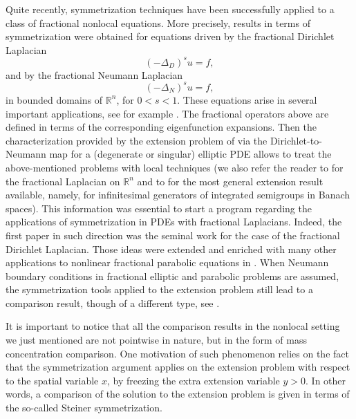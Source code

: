 \documentclass[a4paper,10pt,reqno]{amsart}
\newcommand{\R}{\mathbb{R}}
\numberwithin{equation}{section}
\begin{document}
Quite recently, symmetrization techniques have been successfully applied to a class of
fractional nonlocal equations. More precisely, results in terms of symmetrization were obtained
for equations driven by the fractional
Dirichlet Laplacian $$(-\Delta_D)^su=f,$$ and by the fractional Neumann
Laplacian $$(-\Delta_N)^su=f,$$ in bounded domains of $\R^n$, for $0<s<1$. These equations arise in
several important applications, see for example
\cite{Allen, Caffarelli-Stinga, Song-Vondracek, StingaVolz}. The fractional operators above are defined in terms of
the corresponding eigenfunction expansions. Then the characterization provided
by the extension problem of \cite{Stinga-Torrea}
via the Dirichlet-to-Neumann map for a (degenerate or singular) elliptic PDE
allows to treat the above-mentioned problems with local techniques
(we also refer the reader to \cite{Caffarelli-Silvestre}
for the fractional Laplacian on $\R^n$ and to \cite{Gale-Miana-Stinga} for the most general extension result
available, namely, for infinitesimal generators of integrated semigroups in Banach spaces).
This information was essential to start a program regarding the applications
of symmetrization in PDEs with fractional Laplacians. Indeed,
the first paper in such direction was the seminal work \cite{VolzDib} for the case of the fractional Dirichlet Laplacian.
Those ideas were extended and enriched with many other applications to nonlinear fractional parabolic
equations in \cite{VAZVOL3,VAZVOL1,VAZVOL2}.
When Neumann boundary conditions in fractional elliptic and parabolic problems are assumed,
the symmetrization tools applied to the extension problem
still lead to a comparison result, though of a different type, see \cite{VOLZNEUM}.

It is important to notice that all the comparison results in the nonlocal setting we just mentioned
are not pointwise in nature, but in the form of mass concentration comparison.
One motivation of such phenomenon relies on the fact that the symmetrization
argument applies on the extension problem with respect to the spatial variable $x$,
by freezing the extra extension variable $y>0$.
In other words, a comparison of the solution to the extension problem
is given in terms of the so-called Steiner symmetrization.
\end{document}
